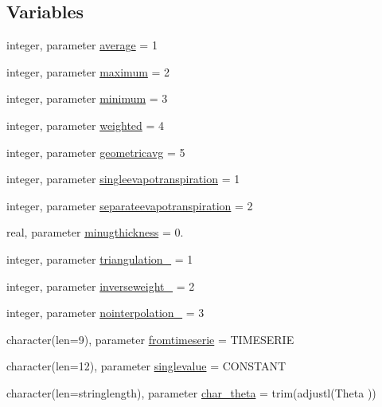 \subsection*{Variables}
\begin{DoxyCompactItemize}
\item 
integer, parameter \mbox{\hyperlink{namespacemoduleporousmedia_a5730b454f11628ff395e43c5a795d3d7}{average}} = 1
\item 
integer, parameter \mbox{\hyperlink{namespacemoduleporousmedia_aaa8cb214ea1121336b19f217f44e094d}{maximum}} = 2
\item 
integer, parameter \mbox{\hyperlink{namespacemoduleporousmedia_aeacb9ecf515364a343f1c8807d0d03a8}{minimum}} = 3
\item 
integer, parameter \mbox{\hyperlink{namespacemoduleporousmedia_a65d641f3f69c2f8685c3dc6620a53cdc}{weighted}} = 4
\item 
integer, parameter \mbox{\hyperlink{namespacemoduleporousmedia_adb7574495c916a0ce17e626b67eda28b}{geometricavg}} = 5
\item 
integer, parameter \mbox{\hyperlink{namespacemoduleporousmedia_a9dbee5252241abf509cd0d987d379a8e}{singleevapotranspiration}} = 1
\item 
integer, parameter \mbox{\hyperlink{namespacemoduleporousmedia_ab621a4e17a5e9b199140296dc23c46dc}{separateevapotranspiration}} = 2
\item 
real, parameter \mbox{\hyperlink{namespacemoduleporousmedia_a4e3d5ff3f6291d44bcd01d8f0357cf5f}{minugthickness}} = 0.
\item 
integer, parameter \mbox{\hyperlink{namespacemoduleporousmedia_ab6920bd67d176c0022920b53355df066}{triangulation\+\_\+}} = 1
\item 
integer, parameter \mbox{\hyperlink{namespacemoduleporousmedia_a3940ae95403224b561f66cef3c75aaab}{inverseweight\+\_\+}} = 2
\item 
integer, parameter \mbox{\hyperlink{namespacemoduleporousmedia_a4867a391fa2e9b3c575ab6606ed45e1b}{nointerpolation\+\_\+}} = 3
\item 
character(len=9), parameter \mbox{\hyperlink{namespacemoduleporousmedia_a9e5f5886dde3038543ba592a0f590876}{fromtimeserie}} = \textquotesingle{}T\+I\+M\+E\+S\+E\+R\+IE\textquotesingle{}
\item 
character(len=12), parameter \mbox{\hyperlink{namespacemoduleporousmedia_a04422be8d50537a662c44bd12eaca375}{singlevalue}} = \textquotesingle{}C\+O\+N\+S\+T\+A\+NT\textquotesingle{}
\item 
character(len=stringlength), parameter \mbox{\hyperlink{namespacemoduleporousmedia_af22fc91889b7575174928fbaace1bf8d}{char\+\_\+theta}} = trim(adjustl(\textquotesingle{}Theta\textquotesingle{} ))

\end{DoxyCompactItemize}
